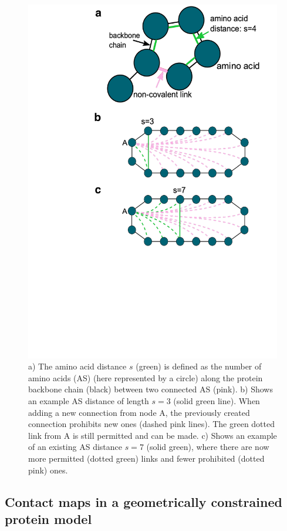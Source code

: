 \documentclass[
reprint,
twocolumn,
amsmath,amssymb,superscriptaddress,aps,
pre]{revtex4-1}
\begin{document}
\begin{figure}[h!]
    \centering
    \includegraphics[width=0.9\columnwidth]{figures/Fig1/Fig1.pdf}
    \caption{a) The amino acid distance $s$ (green) is defined as the number of amino acids (AS) (here represented by a circle) along the protein backbone chain (black) between two connected AS (pink). b) Shows an example AS distance of length $s=3$ (solid green line). When adding a new connection from node A, the previously created connection prohibits new ones (dashed pink lines). The green dotted link from A is still permitted and can be made. c) Shows an example of an existing AS distance $s=7$ (solid green), where there are now more permitted (dotted green) links and fewer prohibited (dotted pink) ones.}
    \label{fig:schematic}
\end{figure}

\subsection{Contact maps in a geometrically constrained protein model}
\end{document}
